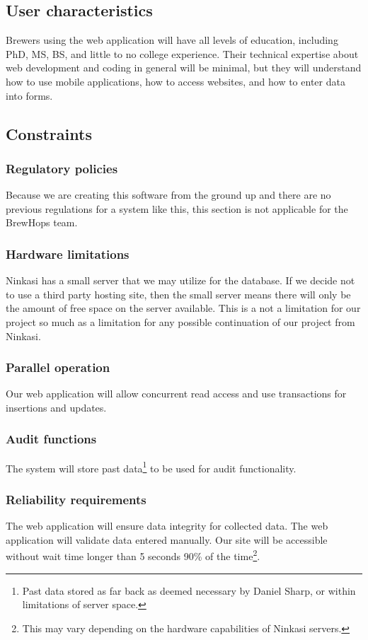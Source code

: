 \documentclass[draftclsnofoot,onecolumn,letterpaper,10pt,compsoc]{IEEEtran}
\begin{document}
	\subsection{User characteristics}
		Brewers using the web application will have all levels of education, including PhD, MS, BS, and little to no college experience.
		Their technical expertise about web development and coding in general will be minimal, but they will understand how to use mobile applications, how to access websites, and how to enter data into forms.

	\subsection{Constraints}
		\subsubsection{Regulatory policies}
		Because we are creating this software from the ground up and there are no previous regulations for a system like this, this section is not applicable for the BrewHops team.

		\subsubsection{Hardware limitations}
		Ninkasi has a small server that we may utilize for the database.
		If we decide not to use a third party hosting site, then the small server means there will only be the amount of free space on the server available.
		This is a not a limitation for our project so much as a limitation for any possible continuation of our project from Ninkasi.

		\subsubsection{Parallel operation}
        Our web application will allow concurrent read access and use transactions for insertions and updates.

		\subsubsection{Audit functions}
        The system will store past data\footnote{Past data stored as far back as deemed necessary by Daniel Sharp, or within limitations of server space.} to be used for audit functionality.

		\subsubsection{Reliability requirements}
		The web application will ensure data integrity for collected data.
		The web application will validate data entered manually.
		Our site will be accessible without wait time longer than 5 seconds 90\% of the time\footnote{This may vary depending on the hardware capabilities of Ninkasi servers.}.
\end{document}
